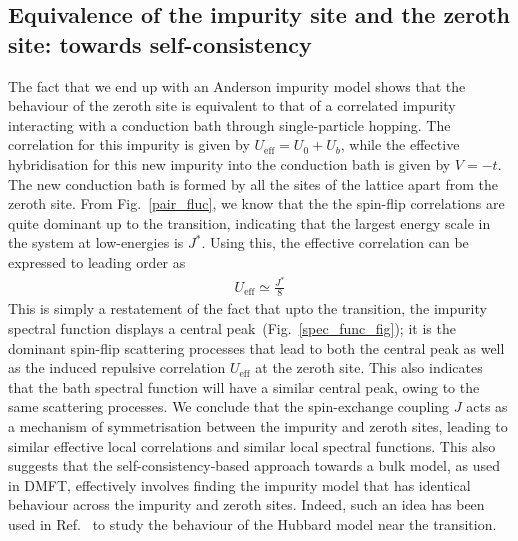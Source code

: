 \subsection{Equivalence of the impurity site and the zeroth site: towards self-consistency}
The fact that we end up with an Anderson impurity model shows that the behaviour of the zeroth site is equivalent to that of a correlated impurity interacting with a conduction bath through single-particle hopping. The correlation for this impurity is given by \(U_\text{eff} = U_0 + U_b\), while the effective hybridisation for this new impurity into the conduction bath is given by \(V = -t\). The new conduction bath is formed by all the sites of the lattice apart from the zeroth site. From Fig.~\ref{pair_fluc}, we know that the the spin-flip correlations are quite dominant up to the transition, indicating that the largest energy scale in the system at low-energies is \(J^*\). Using this, the effective correlation can be expressed to leading order as
\begin{equation}\begin{aligned}
	U_\text{eff} \simeq \frac{J^*}{8}
\end{aligned}\end{equation}
This is simply a restatement of the fact that upto the transition, the impurity spectral function displays a central peak~(Fig.~\ref{spec_func_fig}); it is the dominant spin-flip scattering processes that lead to both the central peak as well as the induced repulsive correlation \(U_\text{eff}\) at the zeroth site. This also indicates that the bath spectral function will have a similar central peak, owing to the same scattering processes. We conclude that the spin-exchange coupling \(J\) acts as a mechanism of symmetrisation between the impurity and zeroth sites, leading to similar effective local correlations and similar local spectral functions. This also suggests that the self-consistency-based approach towards a bulk model, as used in DMFT, effectively involves finding the impurity model that has identical behaviour across the impurity and zeroth sites. Indeed, such an idea has been used in Ref.~\cite{moeller_1995} to study the behaviour of the Hubbard model near the transition. 

